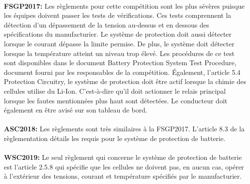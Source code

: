		\paragraph{}
		\textbf{FSGP2017:} Les règlements pour cette compétition sont les plus sévères puisque les équipes doivent passer les tests de vérifications. Ces tests comprennent la détection d'un dépassement de la tension au-dessus et en dessous des spécifications du manufacturier. Le système de protection doit aussi détecter lorsque le courant dépasse la limite permise. De plus, le système doit détecter lorsque la température atteint un niveau trop élevé. Les procédures de ce test sont disponibles dans le document Battery Protection System Test Procedure, document fourni par les responsables de la compétition. Également, l'article 5.4 Protection Circuitry, le système de protection doit être actif lorsque la chimie des cellules utilise du Li-Ion. C'est-à-dire qu'il doit actionner le relais principal lorsque les fautes mentionnées plus haut sont détectées. Le conducteur doit également en être avisé sur son tableau de bord. \cite{reg_fsgp2017}
		
		\paragraph{}
		\textbf{ASC2018:} Les règlements sont très similaires à la FSGP2017. L'article 8.3 de la règlementation détails les requis pour le système de protection de batterie. \cite{reg_asc2018}
		
		\paragraph{}
		\textbf{WSC2019:} Le seul règlement qui concerne le système de protection de batterie est l'article 2.5.8 qui spécifie que les cellules ne doivent pas, en aucun cas, opérer à l'extérieur des tensions, courant et température spécifiés par le manufacturier. \cite{reg_wsc2017}
